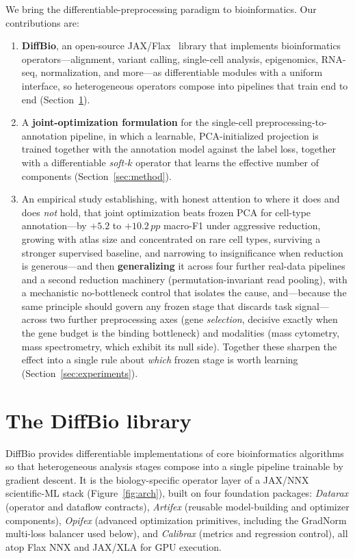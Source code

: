 \documentclass[10pt,twocolumn]{article}
\newcommand{\pp}{\,pp}
\begin{document}
We bring the differentiable-preprocessing paradigm to bioinformatics. Our contributions
are:
\begin{enumerate}\itemsep2pt
\item \textbf{DiffBio}, an open-source JAX/Flax~\citep{jax2018,flax2020} library that
implements bioinformatics operators---alignment, variant calling, single-cell analysis,
epigenomics, RNA-seq, normalization, and more---as differentiable modules with a uniform
interface, so heterogeneous operators compose into pipelines that train end to end
(Section~\ref{sec:library}).
\item A \textbf{joint-optimization formulation} for the single-cell preprocessing-to-annotation
pipeline, in which a learnable, PCA-initialized projection is trained together with the
annotation model against the label loss, together with a differentiable
\emph{soft-$k$} operator that learns the effective number of components
(Section~\ref{sec:method}).
\item An empirical study establishing, with honest attention to where it does and does
\emph{not} hold, that joint optimization beats frozen PCA for cell-type annotation---by
$+5.2$ to $+10.2\pp$ macro-F1 under aggressive reduction, growing with atlas size and
concentrated on rare cell types, surviving a stronger supervised baseline, and narrowing
to insignificance when reduction is generous---and then \textbf{generalizing} it across
four further real-data pipelines and a second reduction machinery (permutation-invariant
read pooling), with a mechanistic no-bottleneck control that isolates the cause, and---because
the same principle should govern any frozen stage that discards task signal---across two
further preprocessing axes (gene \emph{selection}, decisive exactly when the gene budget is the
binding bottleneck) and modalities (mass cytometry, mass spectrometry, which exhibit its null
side). Together these sharpen the effect into a single rule about \emph{which} frozen stage is
worth learning (Section~\ref{sec:experiments}).
\end{enumerate}

\section{The DiffBio library}
\label{sec:library}

DiffBio provides differentiable implementations of core bioinformatics algorithms so that
heterogeneous analysis stages compose into a single pipeline trainable by gradient descent.
It is the biology-specific operator layer of a JAX/NNX scientific-ML stack
(Figure~\ref{fig:arch}), built on four foundation packages: \emph{Datarax} (operator and
dataflow contracts), \emph{Artifex} (reusable model-building and optimizer components),
\emph{Opifex} (advanced optimization primitives, including the GradNorm multi-loss balancer
used below), and \emph{Calibrax} (metrics and regression control), all atop Flax NNX and
JAX/XLA for GPU execution.
\end{document}
